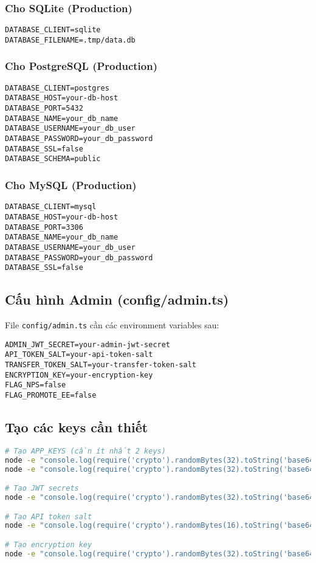 \documentclass[12pt,a4paper]{article}
\begin{document}
\subsubsection{Cho SQLite (Production)}
\begin{lstlisting}[language=plaintext]
DATABASE_CLIENT=sqlite
DATABASE_FILENAME=.tmp/data.db
\end{lstlisting}

\subsubsection{Cho PostgreSQL (Production)}
\begin{lstlisting}[language=plaintext]
DATABASE_CLIENT=postgres
DATABASE_HOST=your-db-host
DATABASE_PORT=5432
DATABASE_NAME=your_db_name
DATABASE_USERNAME=your_db_user
DATABASE_PASSWORD=your_db_password
DATABASE_SSL=false
DATABASE_SCHEMA=public
\end{lstlisting}

\subsubsection{Cho MySQL (Production)}
\begin{lstlisting}[language=plaintext]
DATABASE_CLIENT=mysql
DATABASE_HOST=your-db-host
DATABASE_PORT=3306
DATABASE_NAME=your_db_name
DATABASE_USERNAME=your_db_user
DATABASE_PASSWORD=your_db_password
DATABASE_SSL=false
\end{lstlisting}

\subsection{Cấu hình Admin (config/admin.ts)}
File \texttt{config/admin.ts} cần các environment variables sau:
\begin{lstlisting}[language=plaintext]
ADMIN_JWT_SECRET=your-admin-jwt-secret
API_TOKEN_SALT=your-api-token-salt
TRANSFER_TOKEN_SALT=your-transfer-token-salt
ENCRYPTION_KEY=your-encryption-key
FLAG_NPS=false
FLAG_PROMOTE_EE=false
\end{lstlisting}

\subsection{Tạo các keys cần thiết}
\begin{lstlisting}[language=bash]
# Tạo APP_KEYS (cần ít nhất 2 keys)
node -e "console.log(require('crypto').randomBytes(32).toString('base64'))"
node -e "console.log(require('crypto').randomBytes(32).toString('base64'))"

# Tạo JWT secrets
node -e "console.log(require('crypto').randomBytes(32).toString('base64'))"

# Tạo API token salt
node -e "console.log(require('crypto').randomBytes(16).toString('base64'))"

# Tạo encryption key
node -e "console.log(require('crypto').randomBytes(32).toString('base64'))"
\end{lstlisting}
\end{document}
